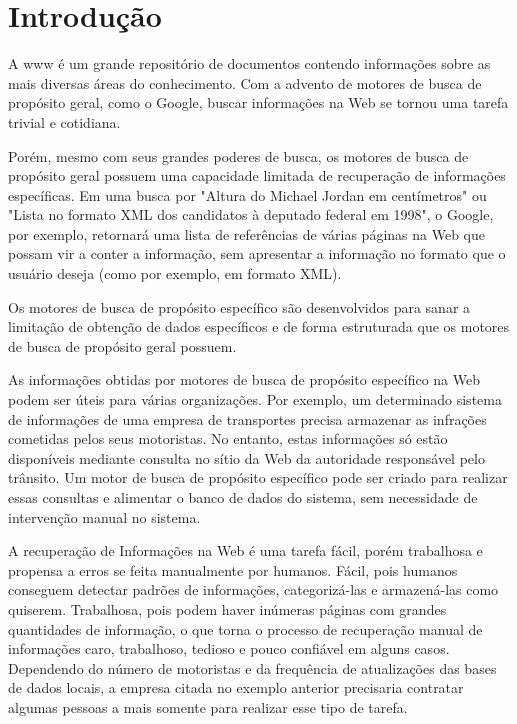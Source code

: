 \chapter{Introdução}
\thispagestyle{fancy}

A \gls{www} é um grande repositório de documentos contendo informações sobre as mais diversas áreas do conhecimento. Com a advento de motores de busca de propósito geral, como o Google, buscar informações na Web se tornou uma tarefa trivial e cotidiana.

Porém, mesmo com seus grandes poderes de busca, os motores de busca de propósito geral possuem uma capacidade limitada de recuperação de informações específicas. Em uma busca por "Altura do Michael Jordan em centímetros" ou "Lista no formato XML dos candidatos à deputado federal em 1998", o Google, por exemplo, retornará uma lista de referências de várias páginas na Web que possam vir a conter a informação, sem apresentar a informação no formato que o usuário deseja (como por exemplo, em formato XML).

Os motores de busca de propósito específico são desenvolvidos para sanar a limitação de obtenção de dados específicos e de forma estruturada que os motores de busca de propósito geral possuem.

As informações obtidas por motores de busca de propósito específico na Web podem ser úteis para várias organizações. Por exemplo, um determinado sistema de informações de uma empresa de transportes precisa armazenar as infrações cometidas pelos seus motoristas. No entanto, estas informações só estão disponíveis mediante consulta no sítio da Web da autoridade responsável pelo trânsito. Um motor de busca de propósito específico pode ser criado para realizar essas consultas e alimentar o banco de dados do sistema, sem necessidade de intervenção manual no sistema.


A recuperação de Informações na Web é uma tarefa fácil, porém trabalhosa e propensa a erros se feita manualmente por humanos. Fácil, pois humanos conseguem detectar padrões de informações, categorizá-las e armazená-las como quiserem. Trabalhosa, pois podem haver inúmeras páginas com grandes quantidades de informação, o que torna o processo de recuperação manual de informações caro, trabalhoso, tedioso e pouco confiável em alguns casos. Dependendo do número de motoristas e da frequência de atualizações das bases de dados locais, a empresa citada no exemplo anterior precisaria contratar algumas pessoas a mais somente para realizar esse tipo de tarefa.

